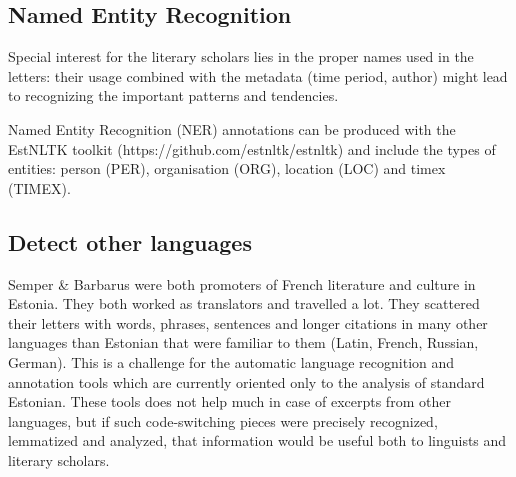 \documentclass[runningheads]{llncs}
\begin{document}
\subsection{Named Entity Recognition}

Special interest for the literary scholars lies in the proper names used in the letters: their usage combined with the metadata (time period, author) might lead to recognizing the important patterns and tendencies. 

Named Entity Recognition (NER) annotations can be produced with the EstNLTK toolkit (https://github.com/estnltk/estnltk) and include the types of entities: person (PER), organisation (ORG), location (LOC) and timex (TIMEX). 

\subsection{Detect other languages}

Semper \& Barbarus were both promoters of French literature and culture in Estonia. They both worked as translators and travelled a lot. They scattered their letters with words, phrases, sentences and longer citations in many other languages than Estonian that were familiar to them (Latin, French, Russian, German). This is a challenge for the automatic language recognition and annotation tools which are currently oriented only to the analysis of standard Estonian. These tools does not help much in case of excerpts from other languages, but if such code-switching pieces were precisely recognized, lemmatized and analyzed, that information would be useful both to linguists and literary scholars.
\end{document}
